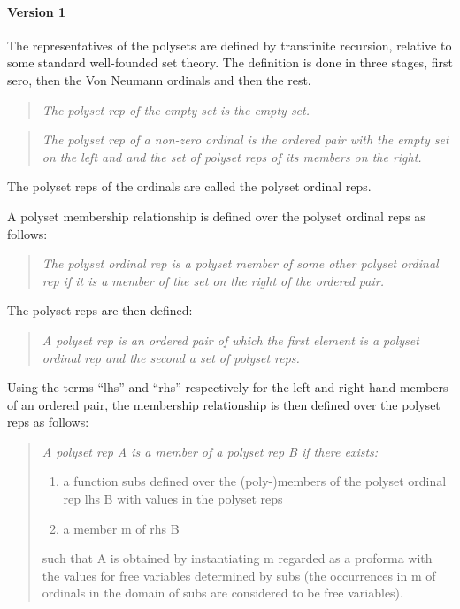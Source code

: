 \documentclass[numreferences]{rbjk}
\begin{document}
\begin{article}
\paragraph{Version 1}

The representatives of the polysets are defined by transfinite recursion, relative to some standard well-founded set theory.
The definition is done in three stages, first sero, then the Von Neumann ordinals and then the rest.

\begin{quote}\label{def:polyset rep}
{\it
The polyset rep of the empty set is the empty set.
}
\end{quote}

\begin{quote}
\emph{
The polyset rep of a non-zero ordinal is the ordered pair with the empty set on the left and and the set of polyset reps of its members on the right.
}
\end{quote}

The polyset reps of the ordinals are called the polyset ordinal reps.

A polyset membership relationship is defined over the polyset ordinal reps as follows:

\begin{quote}
\emph{
The polyset ordinal rep is a polyset member of some other polyset ordinal rep if it is a member of the set on the right of the ordered pair.
}
\end{quote}

The polyset reps are then defined:

\begin{quote}
\emph{
A polyset rep is an ordered pair of which the first element is a polyset ordinal rep and the second a set of polyset reps.
}
\end{quote}

Using the terms ``lhs'' and ``rhs'' respectively for the left and right hand members of an ordered pair, the membership relationship is then defined over the polyset reps as follows:

\begin{quotation}
{\it
A polyset rep A is a member of a polyset rep B if there exists:
\begin{enumerate}
\item a function \textsf{subs} defined over the (poly-)members of the polyset ordinal rep \textsf{lhs B} with values in the polyset reps
\item a member \textsf{m} of \textsf{rhs B}
\end{enumerate}
such that A is obtained by instantiating \textsf{m} regarded as a proforma with the values for free variables determined by \textsf{subs} (the occurrences in \textsf{m} of ordinals in the domain of \textsf{subs} are considered to be free variables).
}
\end{quotation}


\end{article}
\end{document}
